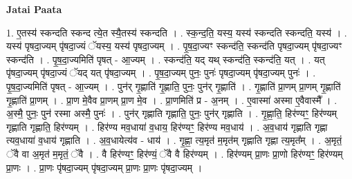 \documentclass[17pt]{extarticle}
\begin{document}
\textbf{Jatai Paata} \newline

1. ए॒तस्य॑ स्कन्दति स्कन्द त्ये॒त स्यै॒तस्य॑ स्कन्दति । . स्क॒न्द॒ति॒ यस्य॒ यस्य॑ स्कन्दति स्कन्दति॒ यस्य॑ । . यस्य॑ पृषदा॒ज्यम् पृ॑षदा॒ज्यं ॅयस्य॒ यस्य॑ पृषदा॒ज्यम् । . पृ॒ष॒दा॒ज्यꣳ स्कन्द॑ति॒ स्कन्द॑ति पृषदा॒ज्यम् पृ॑षदा॒ज्यꣳ स्कन्द॑ति । . पृ॒ष॒दा॒ज्यमिति॑ पृषत् - आ॒ज्यम् । . स्कन्द॑ति॒ यद् यथ् स्कन्द॑ति॒ स्कन्द॑ति॒ यत् । . यत् पृ॑षदा॒ज्यम् पृ॑षदा॒ज्यं ॅयद् यत् पृ॑षदा॒ज्यम् । . पृ॒ष॒दा॒ज्यम् पुनः॒ पुनः॑ पृषदा॒ज्यम् पृ॑षदा॒ज्यम् पुनः॑ । . पृ॒ष॒दा॒ज्यमिति॑ पृषत् - आ॒ज्यम् । . पुन॑र् गृ॒ह्णाति॑ गृ॒ह्णाति॒ पुनः॒ पुन॑र् गृ॒ह्णाति॑ । . गृ॒ह्णाति॑ प्रा॒णम् प्रा॒णम् गृ॒ह्णाति॑ गृ॒ह्णाति॑ प्रा॒णम् । . प्रा॒ण मे॒वैव प्रा॒णम् प्रा॒ण मे॒व । . प्रा॒णमिति॑ प्र - अ॒नम् । . ए॒वास्मा॑ अस्मा ए॒वैवास्मै᳚ । . अ॒स्मै॒ पुनः॒ पुन॑ रस्मा अस्मै॒ पुनः॑ । . पुन॑र् गृह्णाति गृह्णाति॒ पुनः॒ पुन॑र् गृह्णाति । . गृ॒ह्णा॒ति॒ हिर॑ण्यꣳ॒॒ हिर॑ण्यम् गृह्णाति गृह्णाति॒ हिर॑ण्यम् । . हिर॑ण्य मव॒धाया॑ व॒धाय॒ हिर॑ण्यꣳ॒॒ हिर॑ण्य मव॒धाय॑ । . अ॒व॒धाय॑ गृह्णाति गृह्णा त्यव॒धाया॑ व॒धाय॑ गृह्णाति । . अ॒व॒धायेत्य॑व - धाय॑ । . गृ॒ह्णा॒ त्य॒मृत॑ म॒मृत॑म् गृह्णाति गृह्णा त्य॒मृत᳚म् । . अ॒मृतं॒ ॅवै वा अ॒मृत॑ म॒मृतं॒ ॅवै । . वै हिर॑ण्यꣳ॒॒ हिर॑ण्यं॒ ॅवै वै हिर॑ण्यम् । . हिर॑ण्यम् प्रा॒णः प्रा॒णो हिर॑ण्यꣳ॒॒ हिर॑ण्यम् प्रा॒णः । . प्रा॒णः पृ॑षदा॒ज्यम् पृ॑षदा॒ज्यम् प्रा॒णः प्रा॒णः पृ॑षदा॒ज्यम् । \newline
\end{document}

